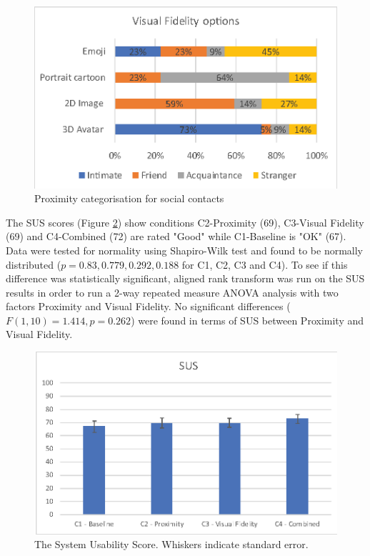 \begin{figure}[ht]
    \centering
    \includegraphics[width=0.8\linewidth]{images/41-visualising-mgia17/analysis-images-01.eps}
    \caption{Proximity categorisation for social contacts}
    \label{fig:contacts:proximity}
\end{figure}

The SUS scores (Figure \ref{fig:contacts:sus}) show conditions C2-Proximity (69), C3-Visual Fidelity (69) and C4-Combined (72) are rated "Good" while C1-Baseline is "OK" (67). Data were tested for normality using Shapiro-Wilk test and found to be normally distributed ($p=0.83, 0.779, 0.292, 0.188$ for C1, C2, C3 and C4). To see if this difference was statistically significant, aligned rank transform was run on the SUS results in order to run a 2-way repeated measure ANOVA analysis with two factors Proximity and Visual Fidelity. No significant differences ($F(1, 10)=1.414,p=0.262$) were found in terms of SUS between Proximity and Visual Fidelity. 

\begin{figure}[ht]
    \centering
    \includegraphics[width=0.8\linewidth]{images/41-visualising-mgia17/analysis-images-02.eps}
    \caption{The System Usability Score. Whiskers indicate standard error.}
    \label{fig:contacts:sus}
\end{figure}

